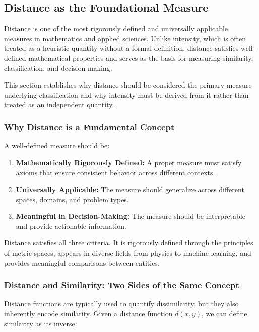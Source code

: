\subsection{Distance as the Foundational Measure}

Distance is one of the most rigorously defined and universally applicable measures in mathematics and applied sciences. Unlike intensity, which is often treated as a heuristic quantity without a formal definition, distance satisfies well-defined mathematical properties and serves as the basis for measuring similarity, classification, and decision-making. 

This section establishes why distance should be considered the primary measure underlying classification and why intensity must be derived from it rather than treated as an independent quantity.

\subsubsection{Why Distance is a Fundamental Concept}

A well-defined measure should be:

\begin{enumerate}
    \item \textbf{Mathematically Rigorously Defined:} A proper measure must satisfy axioms that ensure consistent behavior across different contexts.
    \item \textbf{Universally Applicable:} The measure should generalize across different spaces, domains, and problem types.
    \item \textbf{Meaningful in Decision-Making:} The measure should be interpretable and provide actionable information.
\end{enumerate}

Distance satisfies all three criteria. It is rigorously defined through the principles of metric spaces, appears in diverse fields from physics to machine learning, and provides meaningful comparisons between entities.

\subsubsection{Distance and Similarity: Two Sides of the Same Concept}

Distance functions are typically used to quantify dissimilarity, but they also inherently encode similarity. Given a distance function \( d(x, y) \), we can define similarity as its inverse:

